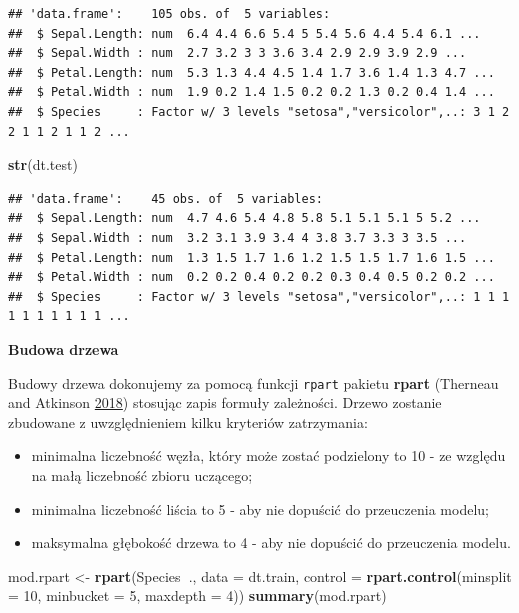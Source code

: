 \documentclass[]{book}
\newenvironment{Shaded}{\begin{snugshade}}{\end{snugshade}}
\newcommand{\DataTypeTok}[1]{\textcolor[rgb]{0.13,0.29,0.53}{#1}}
\newcommand{\DecValTok}[1]{\textcolor[rgb]{0.00,0.00,0.81}{#1}}
\newcommand{\KeywordTok}[1]{\textcolor[rgb]{0.13,0.29,0.53}{\textbf{#1}}}
\newcommand{\NormalTok}[1]{#1}
\newcommand{\OperatorTok}[1]{\textcolor[rgb]{0.81,0.36,0.00}{\textbf{#1}}}
\newcommand{\StringTok}[1]{\textcolor[rgb]{0.31,0.60,0.02}{#1}}
\providecommand{\tightlist}{%
  \setlength{\itemsep}{0pt}\setlength{\parskip}{0pt}}
\theoremstyle{plain}
\theoremstyle{definition}
\theoremstyle{definition}
\theoremstyle{definition}
\theoremstyle{definition}
\theoremstyle{remark}
\begin{document}
\begin{verbatim}
## 'data.frame':    105 obs. of  5 variables:
##  $ Sepal.Length: num  6.4 4.4 6.6 5.4 5 5.4 5.6 4.4 5.4 6.1 ...
##  $ Sepal.Width : num  2.7 3.2 3 3 3.6 3.4 2.9 2.9 3.9 2.9 ...
##  $ Petal.Length: num  5.3 1.3 4.4 4.5 1.4 1.7 3.6 1.4 1.3 4.7 ...
##  $ Petal.Width : num  1.9 0.2 1.4 1.5 0.2 0.2 1.3 0.2 0.4 1.4 ...
##  $ Species     : Factor w/ 3 levels "setosa","versicolor",..: 3 1 2 2 1 1 2 1 1 2 ...
\end{verbatim}

\begin{Shaded}
\begin{Highlighting}[]
\KeywordTok{str}\NormalTok{(dt.test)}
\end{Highlighting}
\end{Shaded}

\begin{verbatim}
## 'data.frame':    45 obs. of  5 variables:
##  $ Sepal.Length: num  4.7 4.6 5.4 4.8 5.8 5.1 5.1 5.1 5 5.2 ...
##  $ Sepal.Width : num  3.2 3.1 3.9 3.4 4 3.8 3.7 3.3 3 3.5 ...
##  $ Petal.Length: num  1.3 1.5 1.7 1.6 1.2 1.5 1.5 1.7 1.6 1.5 ...
##  $ Petal.Width : num  0.2 0.2 0.4 0.2 0.2 0.3 0.4 0.5 0.2 0.2 ...
##  $ Species     : Factor w/ 3 levels "setosa","versicolor",..: 1 1 1 1 1 1 1 1 1 1 ...
\end{verbatim}

\textbf{Budowa drzewa}

Budowy drzewa dokonujemy za pomocą funkcji \texttt{rpart} pakietu \textbf{rpart} (Therneau and Atkinson \protect\hyperlink{ref-R-rpart}{2018}) stosując zapis formuły zależności. Drzewo zostanie zbudowane z uwzględnieniem kilku kryteriów zatrzymania:

\begin{itemize}
\tightlist
\item
  minimalna liczebność węzła, który może zostać podzielony to 10 - ze względu na małą liczebność zbioru uczącego;
\item
  minimalna liczebność liścia to 5 - aby nie dopuścić do przeuczenia modelu;
\item
  maksymalna głębokość drzewa to 4 - aby nie dopuścić do przeuczenia modelu.
\end{itemize}

\begin{Shaded}
\begin{Highlighting}[]
\NormalTok{mod.rpart <-}\StringTok{ }\KeywordTok{rpart}\NormalTok{(Species}\OperatorTok{~}\NormalTok{., }\DataTypeTok{data =}\NormalTok{ dt.train, }
                   \DataTypeTok{control =} \KeywordTok{rpart.control}\NormalTok{(}\DataTypeTok{minsplit =} \DecValTok{10}\NormalTok{,}
                                           \DataTypeTok{minbucket =} \DecValTok{5}\NormalTok{,}
                                           \DataTypeTok{maxdepth =} \DecValTok{4}\NormalTok{))}
\KeywordTok{summary}\NormalTok{(mod.rpart)}
\end{Highlighting}
\end{Shaded}
\end{document}
